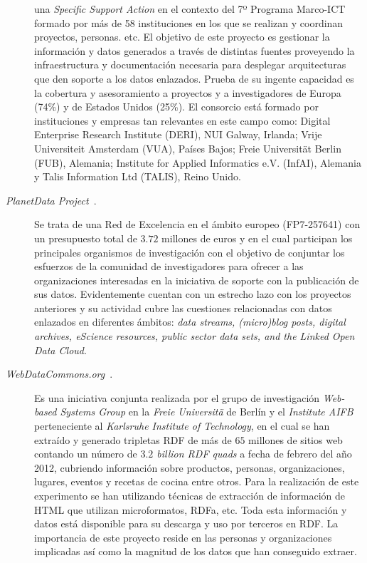 \begin{description}
una \textit{Specific Support Action} en el contexto del 7º Programa Marco-ICT formado por más de 58 instituciones
en los que se realizan y coordinan proyectos, personas. etc. El objetivo de este proyecto es gestionar la información
y datos generados a través de distintas fuentes proveyendo la infraestructura y documentación necesaria para
desplegar arquitecturas que den soporte a los datos enlazados. Prueba de su ingente capacidad es la cobertura y 
asesoramiento a proyectos y a investigadores de Europa (74\%) y de Estados Unidos (25\%). El consorcio
está formado por instituciones y empresas tan relevantes en este campo como: Digital Enterprise Research Institute (DERI), NUI Galway, Irlanda;
Vrije Universiteit Amsterdam (VUA), Países Bajos; Freie Universität Berlin (FUB), Alemania; Institute for Applied Informatics e.V. (InfAI), Alemania y
Talis Information Ltd (TALIS), Reino Unido.

\item [\textit{PlanetData Project}~\cite{planet-data-project}.] Se trata de una Red de Excelencia en el 
ámbito europeo (FP7-257641) con un presupuesto total de $3.72$ millones de euros y en el cual participan los principales 
organismos de investigación con el objetivo de conjuntar los esfuerzos de la comunidad de investigadores para ofrecer 
a las organizaciones interesadas en la iniciativa de \linkeddata soporte con la publicación de sus datos. Evidentemente 
cuentan con un estrecho lazo con los proyectos anteriores y su actividad cubre las cuestiones relacionadas con datos enlazados 
en diferentes ámbitos: \textit{data streams, (micro)blog posts, digital archives, eScience resources, public sector data sets, and the Linked Open Data Cloud}.

\item [\textit{WebDataCommons.org}~\cite{web-data-commons-project}.] Es una iniciativa conjunta realizada por el grupo 
de investigación \textit{Web-based Systems Group} en la \textit{Freie Universit\"{a}} de Berlín y el 
\textit{Institute AIFB} perteneciente al \textit{Karlsruhe Institute of Technology}, en el cual se han extraído 
y generado tripletas \gls{RDF} de más de $65$ millones de sitios web contando un número de 
\textit{$3.2$ billion RDF quads} a fecha de febrero del año 2012, cubriendo información sobre productos, 
personas, organizaciones, lugares, eventos y recetas de cocina entre otros. Para la realización de este 
experimento se han utilizando técnicas de extracción de información de \gls{HTML} que utilizan microformatos, RDFa, etc. 
Toda esta información y datos está disponible para su descarga y uso por terceros en RDF. La importancia de este proyecto 
reside en las personas y organizaciones implicadas así como la magnitud de los datos que han conseguido extraer.


\end{description}
